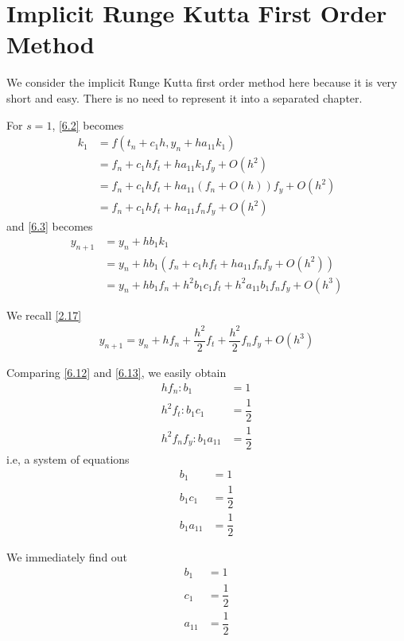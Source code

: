 \documentclass[a4paper,oneside]{book}
\numberwithin{equation}{chapter}
\begin{document}
\section{Implicit Runge Kutta First Order Method}
We consider the implicit Runge Kutta first order method here because it is very short and easy. There is no need to represent it into a separated chapter.

For $s=1$, \eqref{6.2} becomes
\begin{align}
{k_1} &= f\left( {{t_n} + {c_1}h,{y_n} + h{a_{11}}{k_1}} \right)\\
& = {f_n} + {c_1}h{f_t} + h{a_{11}}{k_1}{f_y} + O\left( {{h^2}} \right)\\
 &= {f_n} + {c_1}h{f_t} + h{a_{11}}\left( {{f_n} + O\left( h \right)} \right){f_y} + O\left( {{h^2}} \right)\\
& = {f_n} + {c_1}h{f_t} + h{a_{11}}{f_n}{f_y} + O\left( {{h^2}} \right)
\end{align}
and \eqref{6.3} becomes
\begin{align}
{{y_{n + 1}}} &= {{y_n}} + h{b_1}{k_1}\\
& = {{y_n}} + h{b_1}\left( {{f_n} + {c_1}h{f_t} + h{a_{11}}{f_n}{f_y} + O\left( {{h^2}} \right)} \right)\\
& = {{y_n}} + h{b_1}{f_n} + {h^2}{b_1}{c_1}{f_t} + {h^2}{a_{11}}{b_1}{f_n}{f_y} + O\left( {{h^3}} \right)
\label{6.12}
\end{align}

We recall \eqref{2.17}
\begin{align}
\label{6.13}
{{y_{n + 1}}} = {{y_n}} + h{f_n} + \dfrac{{{h^2}}}{2}{f_t} + \dfrac{{{h^2}}}{2}{f_n}{f_y} + O\left( {{h^3}} \right) 
\end{align}

Comparing \eqref{6.12} and \eqref{6.13}, we easily obtain
\begin{align}
h{f_n}:{b_1} &= 1\\
{h^2}{f_t}:{b_1}{c_1} &= \dfrac{1}{2}\\
{h^2}{f_n}{f_y}:{b_1}{a_{11}} &= \dfrac{1}{2}
\end{align}
i.e, a system of equations
\begin{align}
{b_1} &= 1\\
{b_1}{c_1} &= \dfrac{1}{2}\\
{b_1}{a_{11}} &= \dfrac{1}{2}
\end{align}

We immediately find out
\begin{align}
{b_1} &= 1\\
{c_1} &= \dfrac{1}{2}\\
{a_{11}} &= \dfrac{1}{2}
\end{align}
\end{document}
